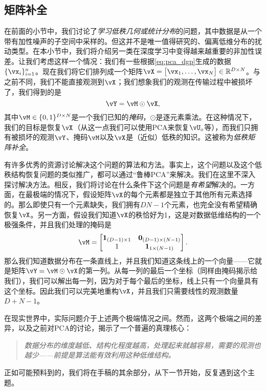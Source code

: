 \documentclass[../../book-main.tex]{subfiles}
\begin{document}
\subsection{矩阵补全}

在前面的小节中，我们讨论了\textit{学习低秩几何或统计分布}的问题，其中数据是从一个带有加性噪声的子空间中采样的。但这并不是唯一值得研究的、偏离低维分布的扰动类型。在本小节中，我们将介绍另一类在深度学习中变得越来越重要的非加性误差。让我们考虑这样一个情况：我们有一些根据\eqref{eq:pca_dgp}生成的数据\(\{\vx_{i}\}_{i = 1}^{n}\)。现在我们将它们排列成一个矩阵\(\vX = \mat{\vx_{1}, \dots, \vx_{N}} \in \R^{D \times N}\)。与之前不同，我们不能直接观测到\(\vX\)；我们想象我们的观测在传输过程中被损坏了，我们得到的是
\begin{equation}
    \vY = \vM \odot \vX,
\end{equation}
其中\(\vM \in \{0, 1\}^{D \times N}\)是一个我们已知的\textit{掩码}，\(\odot\)是逐元素乘法。在这种情况下，我们的目标是恢复\(\vX\)（从这一点我们可以使用PCA来恢复\(\vU_{o}\)等），而我们只拥有被损坏的观测\(\vY\)、掩码\(\vM\)以及\(\vX\)是（近似）低秩的知识。这被称为\textit{低秩矩阵补全}。

有许多优秀的资源讨论解决这个问题的算法和方法\cite{Wright-Ma-2022}。事实上，这个问题以及这个低秩结构恢复问题的类似推广，都可以通过“鲁棒PCA”来解决。我们在这里不深入探讨解决方法。相反，我们将讨论在什么条件下这个问题是\textit{有希望}解决的。一方面，在最极端的情况下，假设矩阵\(\vX\)的每个元素都是独立于其他所有元素选择的。那么即使只有一个元素缺失，我们拥有\(DN - 1\)个元素，也完全没有希望精确恢复\(\vX\)。另一方面，假设我们知道\(\vX\)的秩恰好为1，这是对数据低维结构的一个极强条件，并且我们处理的掩码是
\begin{equation}
    \vM = \mat{\vone_{(D - 1) \times 1} & \vzero_{(D - 1) \times (N - 1)} \\ 1 & \vone_{1 \times (N - 1)} }.
\end{equation}
那么我们知道数据分布在一条直线上，并且我们知道这条线上的一个向量——它就是矩阵\(\vY = \vM \odot \vX\)的第一列。从每一列的最后一个坐标（同样由掩码揭示给我们），我们可以解出每一列，因为对于每个最后的坐标，线上只有一个向量具有这个坐标。因此我们可以完美地重构\(\vX\)，并且我们只需要线性的观测数量\(D + N - 1\)。

在现实世界中，实际问题介于上述两个极端情况之间。然而，这两个极端之间的差异，以及之前对PCA的讨论，揭示了一个普遍的真理核心：
\begin{quote}
    \centering
    \textit{数据分布的维度越低、结构化程度越高，处理起来就越容易，需要的观测也越少——前提是算法能有效利用这种低维结构。}
\end{quote}
正如可能预料到的，我们将在手稿的其余部分，从下一节开始，反复遇到这个主题。
\end{document}
